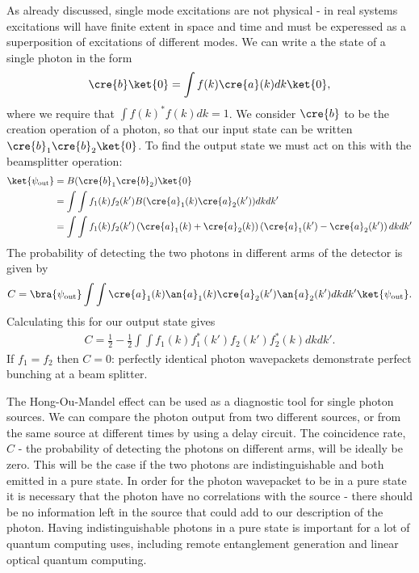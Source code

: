 As already discussed, single mode excitations are not physical - in real systems excitations will have finite extent in space and time and must be experessed as a superposition of excitations of different modes. We can write a the state of a single photon in the form
\begin{align}
  \cre{b}\ket{0} = \int f(k) \cre{a}(k) dk\ket{0},
\end{align}
where we require that $\int f(k)^* f(k) dk = 1$. We consider $\cre{b}$ to be the creation operation of a photon, so that our input state can be written $\cre{b}_1\cre{b}_2\ket{0}$. To find the output state we must act on this with the beamsplitter operation:
\begin{align}
  \ket{\psi_\text{out}} &= B(\cre{b}_1 \cre{b}_2)\ket{0}\\
  & = \int \int f_1(k)f_2(k') B(\cre{a}_1(k) \cre{a}_2(k')) dkdk' \\
  & = \int \int f_1(k)f_2(k') \left(\cre{a}_{1}(k) + \cre{a}_{2}(k)\right) \left(\cre{a}_{1}(k') - \cre{a}_{2}(k')\right)  dkdk' \\
\end{align}
The probability of detecting the two photons in different arms of the detector is given by
\begin{align}
  C = \bra{\psi_\text{out}} \int\int \cre{a}_1(k)\an{a}_1(k) \cre{a}_2(k')\an{a}_2(k') dk dk'\ket{\psi_\text{out}}.
\end{align}
Calculating this for our output state gives
\begin{align}
  C = \frac{1}{2} - \frac{1}{2}\int\int f_1(k)f_1^*(k')f_2(k')f_2^*(k) dk dk'.
\end{align}
If $f_1 = f_2$ then $C=0$: perfectly identical photon wavepackets demonstrate perfect bunching at a beam splitter. 

The Hong-Ou-Mandel effect can be used as a diagnostic tool for single photon sources. We can compare the photon output from two different sources, or from the same source at different times by using a delay circuit. The coincidence rate, $C$ - the probability of detecting the photons on different arms, will be ideally be zero. This will be the case if the two photons are indistinguishable and both emitted in a pure state. In order for the photon wavepacket to be in a pure state it is necessary that the photon have no correlations with the source - there should be no information left in the source that could add to our description of the photon. Having indistinguishable photons in a pure state is important for a lot of quantum computing uses, including remote entanglement generation and linear optical quantum computing. 

